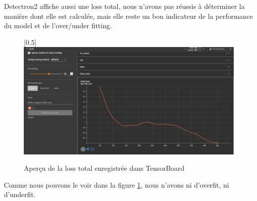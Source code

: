Detectron2 affiche aussi une loss total, nous n'avons pas réussis à déterminer la manière dont elle est calculée, mais elle reste un bon indicateur de la performance du model et de l'over/under fitting.
\begin{figure}[hb!]
    \centering
    \scalebox{0.5}[0.5]{\includegraphics[width=\textwidth]{images/loss_faster_rcnn.png}}
    \caption{Aperçu de la loss total enregistrée dans TensorBoard}
    \label{fig:loss_faster_rcnn}
\end{figure}
Comme nous pouvons le voir dans la figure \ref{fig:loss_faster_rcnn}, nous n'avons ni d'overfit, ni d'underfit.


